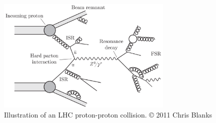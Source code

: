\begin{figure}
	\centering
	\includegraphics[width=0.75\textwidth]{pp_interaction}
	\caption{Illustration of an LHC proton-proton collision. © 2011 Chris Blanks}
	\label{fig:pp_interaction}
\end{figure}